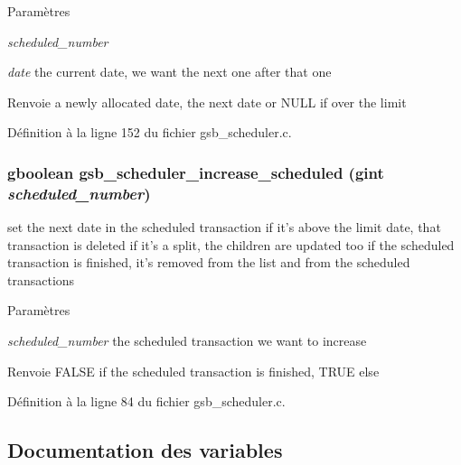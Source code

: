 \begin{DoxyParams}{Paramètres}
\item[{\em scheduled\_\-number}]\item[{\em date}]the current date, we want the next one after that one\end{DoxyParams}
\begin{DoxyReturn}{Renvoie}
a newly allocated date, the next date or NULL if over the limit 
\end{DoxyReturn}


Définition à la ligne 152 du fichier gsb\_\-scheduler.c.

\subsubsection[{gsb\_\-scheduler\_\-increase\_\-scheduled}]{\setlength{\rightskip}{0pt plus 5cm}gboolean gsb\_\-scheduler\_\-increase\_\-scheduled (gint {\em scheduled\_\-number})}\label{gsb__scheduler_8c_a835bf4208d739a5332dbfbf4f7ae066e}
set the next date in the scheduled transaction if it's above the limit date, that transaction is deleted if it's a split, the children are updated too if the scheduled transaction is finished, it's removed from the list and from the scheduled transactions


\begin{DoxyParams}{Paramètres}
\item[{\em scheduled\_\-number}]the scheduled transaction we want to increase\end{DoxyParams}
\begin{DoxyReturn}{Renvoie}
FALSE if the scheduled transaction is finished, TRUE else 
\end{DoxyReturn}


Définition à la ligne 84 du fichier gsb\_\-scheduler.c.



\subsection{Documentation des variables}
